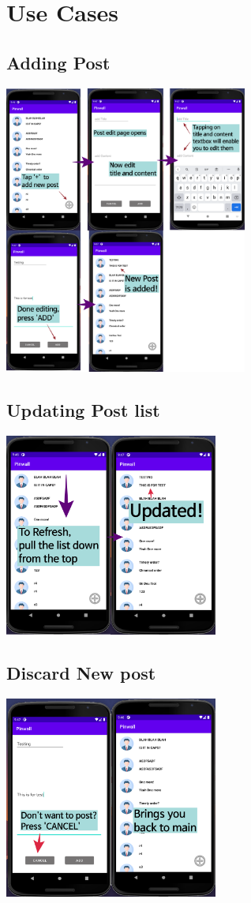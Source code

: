 \documentclass[conference]{IEEEtran}
\numberwithin{figure}{subsection}
\begin{document}
\section{Use Cases}
\subsection{Adding Post}
\includegraphics[width = 8cm]{bibtex/images/use case 1.png}

\subsection{Updating Post list}
\includegraphics[width = 7cm]{bibtex/images/use case 2.png}

\subsection{Discard New post}
\includegraphics[width = 7cm]{bibtex/images/use case 3.png}
\end{document}

